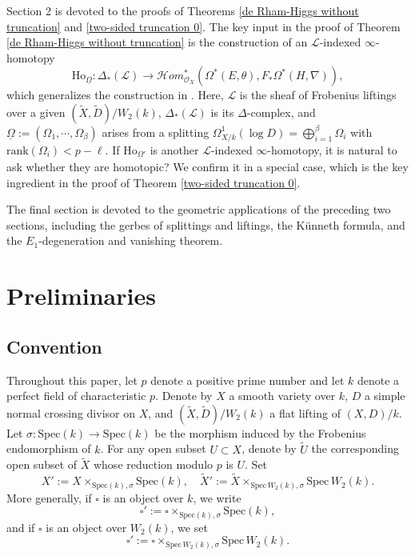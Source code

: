 \documentclass[12pt, a4paper]{article}
\begin{document}
Section 2 is devoted to the proofs of Theorems \ref{de Rham-Higgs without truncation} and \ref{two-sided truncation 0}. The key input in the proof of Theorem \ref{de Rham-Higgs without truncation} is the construction of an $\mathcal L$-indexed $\infty$-homotopy
$$
\mathrm{Ho}_{\underline\Omega}:\Delta_*(\mathcal L)\to\mathcal Hom^*_{\mathcal O_X}(\Omega^*(E,\theta),F_*\Omega^*(H,\nabla)),
$$
which generalizes the construction in \cite{SZ1}. Here, $\mathcal L$ is the sheaf of Frobenius liftings over a given  $(\tilde X,\tilde D)/W_2(k)$, $\Delta_*(\mathcal L)$ is its $\Delta$-complex, and $\underline\Omega:=(\Omega_1,\cdots,\Omega_\beta)$ arises from a splitting $\Omega_{X/k}^1(\log D)=\bigoplus_{i=1}^\beta\Omega_i$ with $\mathrm{rank}(\Omega_i)<p-\ell$. If $\mathrm{Ho}_{\underline\Omega'}$ is another $\mathcal L$-indexed $\infty$-homotopy, it is natural to ask whether they are homotopic? We confirm it in a special case, which is the key ingredient in the proof of Theorem \ref{two-sided truncation 0}.

The final section is devoted to the geometric applications of the preceding two sections, including the gerbes of splittings and liftings, the K\"unneth formula, and the $E_1$-degeneration and vanishing theorem.
\fi
\section{Preliminaries}

\subsection{Convention}
 Throughout this paper, let $p$ denote a positive prime number and let $k$ denote a perfect field of characteristic $p$. Denote by $X$ a smooth variety over $k$, $D$ a simple normal crossing divisor on $X$, and $(\tilde X,\tilde D)/W_2(k)$ a flat lifting of $(X,D)/k$. Let $\sigma:\mathrm{Spec}(k)\to\mathrm{Spec}(k)$ be the morphism induced by the Frobenius endomorphism of $k$. For any open subset \( U \subset X \), denote by \( \widetilde{U} \) the corresponding open subset of \( \widetilde{X} \) whose reduction modulo \( p \) is \( U \). Set
\[
X' := X \times_{\mathrm{Spec}(k), \sigma} \mathrm{Spec}(k), \quad 
\widetilde{X}' := \widetilde{X} \times_{\mathrm{Spec}\, W_2(k), \sigma} \mathrm{Spec}\, W_2(k).
\]
More generally, if \( \square \) is an object over \( k \), we write
\[
\square' := \square \times_{\mathrm{Spec}(k), \sigma} \mathrm{Spec}(k),
\]
and if \( \square \) is an object over \( W_2(k) \), we set
\[
\square' := \square \times_{\mathrm{Spec}\, W_2(k), \sigma} \mathrm{Spec}\, W_2(k).
\]
\end{document}
